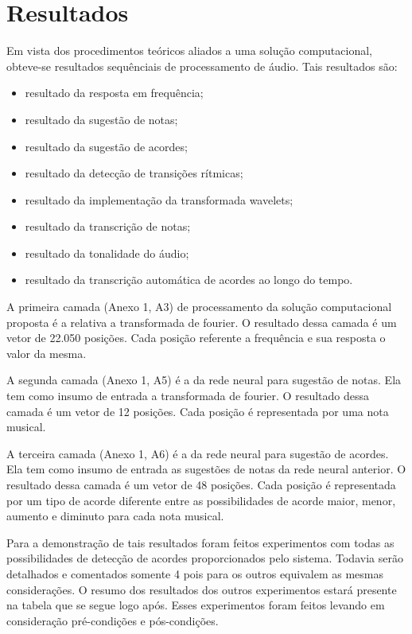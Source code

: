 \chapter{Resultados}
\label{chap:resultados}

Em vista dos procedimentos teóricos aliados a uma solução computacional, obteve-se resultados sequênciais de processamento de áudio. Tais resultados são:
\begin{itemize}
    \item resultado da resposta em frequência;
    \item resultado da sugestão de notas;
    \item resultado da sugestão de acordes;
    \item resultado da detecção de transições rítmicas;
    \item resultado da implementação da transformada wavelets;
    \item resultado da transcrição de notas;
    \item resultado da tonalidade do áudio;
    \item resultado da transcrição automática de acordes ao longo do tempo.
\end{itemize}

A primeira camada (Anexo 1, A3) de processamento da solução computacional proposta é a relativa a transformada de fourier. O resultado dessa camada é um vetor de 22.050 posições. Cada posição referente a frequência e sua resposta o valor da mesma.

A segunda camada (Anexo 1, A5) é a da rede neural para sugestão de notas. Ela tem como insumo de entrada a transformada de fourier. O resultado dessa camada é um vetor de 12 posições. Cada posição é representada por uma nota musical.

A terceira camada (Anexo 1, A6) é a da rede neural para sugestão de acordes. Ela tem como insumo de entrada as sugestões de notas da rede neural anterior. O resultado dessa camada é um vetor de 48 posições. Cada posição é representada por um tipo de acorde diferente entre as possibilidades de acorde maior, menor, aumento e diminuto para cada nota musical.

Para a demonstração de tais resultados foram feitos experimentos com todas as possibilidades de detecção de acordes proporcionados pelo sistema. Todavia serão detalhados e comentados somente 4 pois para os outros equivalem as mesmas considerações. O resumo dos resultados dos outros experimentos estará presente na tabela que se segue logo após. Esses experimentos foram feitos levando em consideração pré-condições e pós-condições.
\newpage

